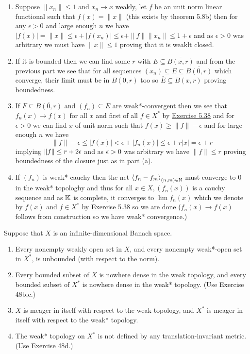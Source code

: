\documentclass[12pt,a4paper]{article}
\begin{document}
\begin{solution}
    \begin{enumerate}[label=\alph*.]
        \item Suppose $\|x_n\|\leq 1$ and $x_n\to x$ weakly, let $f$ be an unit norm linear functional such that $f(x)=\|x\|$ (this exists by theorem 5.8b) then for any $\epsilon>0$ and large enough $n$ we have $|f(x)|=\|x\|\leq \epsilon+|f(x_n)|\leq\epsilon+\|f\|\|x_n\|\leq 1+\epsilon$ and as $\epsilon>0$ was arbitrary we must have $\|x\|\leq 1$ proving that it is weaklt closed. 
        \item If it is bounded then we can find some $r$ with $E \subseteq \overline{B(x,r)}$ and from the previous part we see that for all sequences $(x_n) \subseteq E \subseteq \overline{B(0,r)}$ which converge, their limit must be in $ \overline{B(0,r)}$ too so $ \overline{E} \subseteq \overline{B(x,r)}$ proving boundedness. 
        \item If $F \subseteq \overline{B(0,r)}$ and $(f_n) \subseteq E$ are weak*-convergent then we see that $f_n(x)\to f(x)$ for all $x$ and first of all $f\in X^*$ by \hyperref[prob:5-38]{Exercise 5.38} and for $\epsilon>0$ we can find $x$ of unit norm such that $f(x)\geq\|f\|-\epsilon$ and for large enough $n$ we have 
            \[
                \|f\|-\epsilon\leq|f(x)|<\epsilon+|f_n(x)|\leq\epsilon+r|x|=\epsilon+r
            \]
            implying $\|f\|\leq r+2\epsilon$ and as $\epsilon>0$ was arbitrary we have $\|f\|\leq r$ proving boundedness of the closure just as in part (a). 
        \item If $(f_n)$ is weak* cauchy then the net $\left\langle f_n-f_m\right\rangle_{(n,m)\in\mathbb{N}}$ must converge to $0$ in the weak* topologhy and thus for all $x\in X,(f_n(x))$ is a cauchy sequence and as $\mathbb{K}$ is complete, it converges to $\lim f_n(x)$ which we denote by $f(x)$ and $f\in X^*$ by \hyperref[prob:5-38]{Exercise 5.38} so we are done ($f_n(x)\to f(x)$ follows from construction so we have weak* convergence.)
    \end{enumerate}
\end{solution}
\begin{problem}\label{prob:5-49}
Suppose that $X$ is an infinite-dimensional Banach space.
\begin{enumerate}[label=\alph*.]
\item Every nonempty weakly open set in $X$, and every nonempty weak*-open set in $X^*$, is unbounded (with respect to the norm).
\item Every bounded subset of $X$ is nowhere dense in the weak topology, and every bounded subset of $X^*$ is nowhere dense in the weak* topology. (Use Exercise 48b,c.)
\item $X$ is meager in itself with respect to the weak topology, and $X^*$ is meager in itself with respect to the weak* topology.
\item The weak* topology on $X^*$ is not defined by any translation-invariant metric. (Use Exercise 48d.)
\end{enumerate}
\end{problem}
\end{document}
